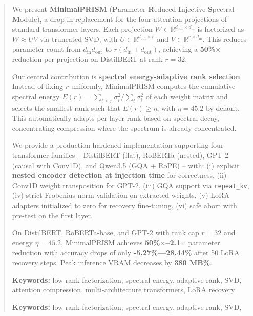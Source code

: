\documentclass{article}
\begin{document}
\maketitle

\begin{abstract}
We present \textbf{MinimalPRISM} (\textbf{P}arameter-\textbf{R}educed \textbf{I}njective 
\textbf{S}pectral \textbf{M}odule), a drop-in replacement for the four attention 
projections of standard transformer layers. Each projection 
$W \in \mathbb{R}^{d_\text{out} \times d_\text{in}}$ is factorized as 
$W \approx U V$ via truncated SVD, with $U \in \mathbb{R}^{d_\text{out} \times r}$ 
and $V \in \mathbb{R}^{r \times d_\text{in}}$. This reduces parameter count 
from $d_\text{in} d_\text{out}$ to $r(d_\text{in} + d_\text{out})$, achieving 
a \textbf{50\%$\times$} reduction per projection on DistilBERT at rank 
$r = 32$.

Our central contribution is \textbf{spectral energy-adaptive rank selection}. Instead 
of fixing $r$ uniformly, MinimalPRISM computes the cumulative spectral energy 
$E(r) = \sum_{i \le r} \sigma_i^2 / \sum_i \sigma_i^2$ of each weight matrix 
and selects the smallest rank such that $E(r) \ge \eta$, with $\eta = 45.2$ 
by default. This automatically adapts per-layer rank based on spectral decay, 
concentrating compression where the spectrum is already concentrated.

We provide a production-hardened implementation supporting four transformer 
families -- DistilBERT (flat), RoBERTa (nested), GPT-2 (causal with Conv1D), 
and Qwen3.5 (GQA + RoPE) -- with:
(i) explicit \textbf{nested encoder detection at injection time} for correctness,
(ii) Conv1D weight transposition for GPT-2,
(iii) GQA support via \texttt{repeat\_kv},
(iv) strict Frobenius norm validation on extracted weights,
(v) LoRA adapters initialized to zero for recovery fine-tuning,
(vi) safe abort with pre-test on the first layer.

On DistilBERT, RoBERTa-base, and GPT-2 with rank cap $r = 32$ and 
energy $\eta = 45.2$, MinimalPRISM achieves \textbf{50\%$\times$--2.1$\times$} 
parameter reduction with accuracy drops of only \textbf{-5.27\%---28.44\%} 
after 50 LoRA recovery steps. Peak inference VRAM decreases 
by \textbf{380 MB\%}.

\textbf{Keywords:} low-rank factorization, spectral energy, adaptive rank, SVD, 
attention compression, multi-architecture transformers, LoRA recovery



\vspace{0.5em}
\noindent\textbf{Keywords:} low-rank factorization, spectral energy, adaptive rank, SVD,
\end{abstract}
\end{document}
